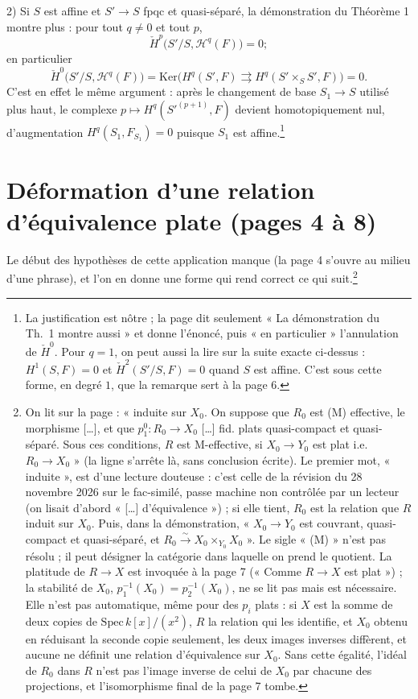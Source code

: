 \documentclass[11pt,a4paper]{article}
\begin{document}
2) Si $S$ est affine et $S' \to S$ fpqc et quasi-séparé, la démonstration du
Théorème 1 montre plus : pour tout $q \neq 0$ et tout $p$,
\[
  \check{H}^p\bigl(S'/S, \mathcal{H}^q(F)\bigr) = 0 ;
\]
en particulier
\[
  \check{H}^0\bigl(S'/S, \mathcal{H}^q(F)\bigr) =
  \mathrm{Ker}\bigl(H^q(S', F) \rightrightarrows H^q(S' \times_S S', F)\bigr)
  = 0 .
\]
C'est en effet le même argument : après le changement de base $S_1 \to S$
utilisé plus haut, le complexe $p \mapsto H^q(S'^{(p+1)}, F)$ devient
homotopiquement nul, d'augmentation $H^q(S_1, F_{S_1}) = 0$ puisque $S_1$ est
affine.\footnote{La justification est nôtre ; la page dit seulement « La
démonstration du Th.~1 montre aussi » et donne l'énoncé, puis « en
particulier » l'annulation de $\check{H}^0$. Pour $q = 1$, on peut aussi la lire sur la
suite exacte ci-dessus : $H^1(S, F) = 0$ et $\check{H}^2(S'/S, F) = 0$ quand $S$
est affine. C'est sous cette forme, en degré $1$, que la remarque sert à la
page 6.}

\section*{Déformation d'une relation d'équivalence plate (pages 4 à 8)}

Le début des hypothèses de cette application manque (la page 4 s'ouvre au
milieu d'une phrase), et l'on en donne
une forme qui rend correct ce qui suit.\footnote{On lit sur la page : « induite
sur $X_0$. On suppose que $R_0$ est (M) effective, le morphisme
[…], et que $p_1^0 : R_0 \to X_0$ […] fid. plats quasi-compact et
quasi-séparé. Sous ces conditions, $R$ est M-effective, si $X_0 \to Y_0$
est plat i.e. $R_0 \to X_0$ » (la ligne s'arrête là, sans conclusion
écrite). Le premier mot, « induite », est d'une lecture douteuse : c'est celle
de la révision du 28 novembre 2026 sur le fac-similé, passe machine non contrôlée par un lecteur (on lisait d'abord « […] d'équivalence ») ; si elle tient, $R_0$ est
la relation que $R$ induit sur $X_0$. Puis, dans la démonstration, « $X_0 \to
Y_0$ est couvrant, quasi-compact et quasi-séparé, et $R_0 \xrightarrow{\sim}
X_0 \times_{Y_0} X_0$ ». Le sigle « (M) » n'est pas résolu ; il peut désigner
la catégorie dans laquelle on prend le quotient. La platitude de $R \to X$ est
invoquée à la page 7 (« Comme $R \to X$ est plat ») ; la stabilité de $X_0$,
$p_1^{-1}(X_0) = p_2^{-1}(X_0)$, ne se lit pas mais est nécessaire. Elle n'est
pas automatique, même pour des $p_i$ plats : si $X$ est la somme de deux
copies de $\mathrm{Spec}\, k[x]/(x^2)$, $R$ la relation qui les identifie, et
$X_0$ obtenu en réduisant la seconde copie seulement, les deux images inverses
diffèrent, et aucune ne définit une relation d'équivalence sur $X_0$. Sans
cette égalité, l'idéal de $R_0$ dans $R$ n'est pas l'image inverse de celui
de $X_0$ par chacune des projections, et l'isomorphisme final de la page 7
tombe.}
\end{document}
